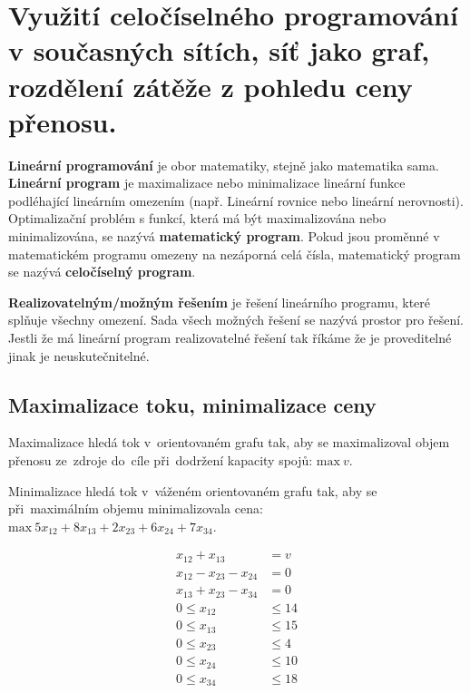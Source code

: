 \clearpage
\section{Využití celočíselného programování v současných sítích, síť jako graf, rozdělení zátěže z pohledu ceny přenosu.}
\textbf{Lineární programování} je obor matematiky, stejně jako matematika sama. \textbf{Lineární program} je maximalizace nebo minimalizace lineární funkce podléhající lineárním omezením (např. Lineární rovnice nebo lineární nerovnosti). Optimalizační problém s funkcí, která má být maximalizována nebo minimalizována, se nazývá \textbf{matematický program}. Pokud jsou proměnné v matematickém programu omezeny na nezáporná celá čísla, matematický program se nazývá \textbf{celočíselný program}.

\textbf{Realizovatelným/možným řešením} je řešení lineárního programu, které splňuje všechny omezení. Sada všech možných řešení se nazývá prostor pro řešení. Jestli že má lineární program realizovatelné řešení tak říkáme že je proveditelné jinak je neuskutečnitelné.

\subsection{Maximalizace toku, minimalizace ceny}

Maximalizace hledá tok v~orientovaném grafu tak, aby se maximalizoval objem přenosu ze~zdroje do~cíle při~dodržení kapacity spojů:
$\text{max}~v$.

Minimalizace hledá tok v~váženém orientovaném grafu tak, aby se při~maximálním objemu minimalizovala cena:
$\text{max}\ 5x_{12} + 8x_{13} + 2x_{23} + 6x_{24} + 7x_{34}$.

\begin{center}\begin{minipage}{0.3\textwidth}
        \begin{align}
            x_{12} + x_{13}          & = v     \\
            x_{12} - x_{23} - x_{24} & = 0     \\
            x_{13} + x_{23} - x_{34} & = 0     \\
            0 \leq x_{12}            & \leq 14 \\
            0 \leq x_{13}            & \leq 15 \\
            0 \leq x_{23}            & \leq 4  \\
            0 \leq x_{24}            & \leq 10 \\
            0 \leq x_{34}            & \leq 18
        \end{align}
    \end{minipage}\end{center}


